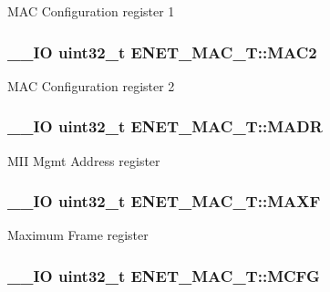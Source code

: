 M\+A\+C Configuration register 1 \hypertarget{struct_e_n_e_t___m_a_c___t_a925a92dbe2a48105e6497378a8cdfcac}{
\subsubsection[{M\+A\+C2}]{\setlength{\rightskip}{0pt plus 5cm}\+\_\+\+\_\+\+I\+O uint32\+\_\+t E\+N\+E\+T\+\_\+\+M\+A\+C\+\_\+\+T\+::\+M\+A\+C2}}\label{struct_e_n_e_t___m_a_c___t_a925a92dbe2a48105e6497378a8cdfcac}
M\+A\+C Configuration register 2 \hypertarget{struct_e_n_e_t___m_a_c___t_afc17c49a8ba00a4a4db6dc0b87d949b7}{
\subsubsection[{M\+A\+D\+R}]{\setlength{\rightskip}{0pt plus 5cm}\+\_\+\+\_\+\+I\+O uint32\+\_\+t E\+N\+E\+T\+\_\+\+M\+A\+C\+\_\+\+T\+::\+M\+A\+D\+R}}\label{struct_e_n_e_t___m_a_c___t_afc17c49a8ba00a4a4db6dc0b87d949b7}
M\+I\+I Mgmt Address register \hypertarget{struct_e_n_e_t___m_a_c___t_a5e6d2bc05984b815f245d2ebd3c067a3}{
\subsubsection[{M\+A\+X\+F}]{\setlength{\rightskip}{0pt plus 5cm}\+\_\+\+\_\+\+I\+O uint32\+\_\+t E\+N\+E\+T\+\_\+\+M\+A\+C\+\_\+\+T\+::\+M\+A\+X\+F}}\label{struct_e_n_e_t___m_a_c___t_a5e6d2bc05984b815f245d2ebd3c067a3}
Maximum Frame register \hypertarget{struct_e_n_e_t___m_a_c___t_a1e733caa47928bbd88205c10549db3b6}{
\subsubsection[{M\+C\+F\+G}]{\setlength{\rightskip}{0pt plus 5cm}\+\_\+\+\_\+\+I\+O uint32\+\_\+t E\+N\+E\+T\+\_\+\+M\+A\+C\+\_\+\+T\+::\+M\+C\+F\+G}}\label{struct_e_n_e_t___m_a_c___t_a1e733caa47928bbd88205c10549db3b6}
